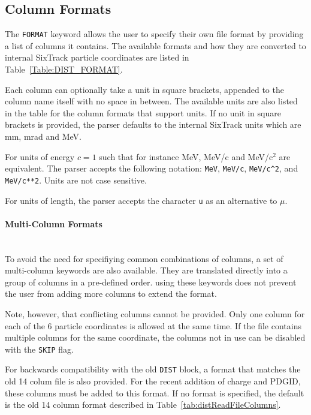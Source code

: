 \subsection{Column Formats}

The \texttt{FORMAT} keyword allows the user to specify their own file format by providing a list of columns it contains.
The available formats and how they are converted to internal SixTrack particle coordinates are listed in Table~\ref{Table:DIST_FORMAT}.

Each column can optionally take a unit in square brackets, appended to the column name itself with no space in between.
The available units are also listed in the table for the column formats that support units.
If no unit in square brackets is provided, the parser defaults to the internal SixTrack units which are mm, mrad and MeV.

For units of energy $c=1$ such that for instance MeV, MeV/c and MeV/c$^2$ are equivalent.
The parser accepts the following notation: \texttt{MeV}, \texttt{MeV/c}, \texttt{MeV/c\^{}2}, and \texttt{MeV/c**2}.
Units are not case sensitive.

For units of length, the parser accepts the character \texttt{u} as an alternative to $\mu$.

\paragraph{Multi-Column Formats}~\\

To avoid the need for specifiying common combinations of columns, a set of multi-column keywords are also available.
They are translated directly into a group of columns in a pre-defined order.
using these keywords does not prevent the user from adding more columns to extend the format.

Note, however, that conflicting columns cannot be provided.
Only one column for each of the 6 particle coordinates is allowed at the same time.
If the file contains multiple columns for the same coordinate, the columns not in use can be disabled with the \texttt{SKIP} flag.

For backwards compatibility with the old \texttt{DIST} block, a format that matches the old 14 colum file is also provided.
For the recent addition of charge and PDGID, these columns must be added to this format.
If no format is specified, the default is the old 14 column format described in Table~\ref{tab:distReadFileColumns}.

